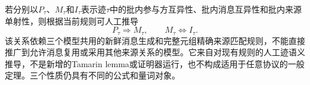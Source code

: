 若分别以$P_\tau$、$M_\tau$和$I_\tau$表示迹$\tau$中的批内参与方互异性、批内消息互异性和批内来源单射性，则根据当前规则可人工推导
\[
  P_\tau\Rightarrow M_\tau,\qquad M_\tau\Leftrightarrow I_\tau.
\]
该关系依赖三个模型共用的新鲜消息生成和完整元组精确来源匹配规则，不能直接推广到允许消息复用或采用其他来源关系的模型。它来自对现有规则的人工迹语义推导，不是新增的Tamarin lemma或证明器运行，也不构成适用于任意协议的一般定理。三个性质仍具有不同的公式和量词对象。

